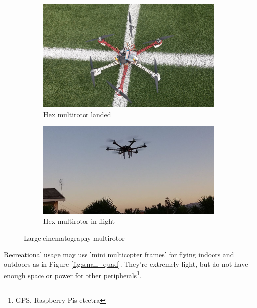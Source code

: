 \begin{figure}[H]
\begin{subfigure}{0.5\textwidth}
\centering
\includegraphics[scale=0.11]{images/hex3.jpg}
\caption{Hex multirotor landed}
\end{subfigure}
\begin{subfigure}{0.5\textwidth}
\centering
\includegraphics[scale=0.3]{images/hex2.jpg}
\caption{Hex multirotor in-flight}
\end{subfigure}
\caption{Large cinematography multirotor}
\label{fig:hex}
\end{figure}

Recreational usage may use 'mini multicopter frames' for flying indoors and outdoors \cite{frame} as in Figure \ref{fig:small_quad}. They're extremely light, but do not have enough space or power for other peripherals\footnote{GPS, Raspberry Pis etcetra}.\\


